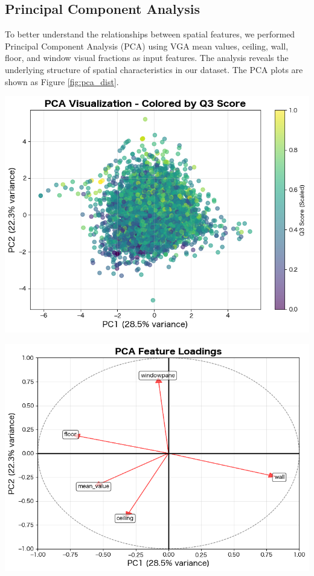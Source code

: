 \documentclass[11pt,a4paper]{article}
\begin{document}
\begin{multicols}{2}
\subsection{Principal Component Analysis}
To better understand the relationships between spatial features, we performed Principal Component Analysis (PCA) 
using VGA mean values, ceiling, wall, floor, and window visual fractions as input features. The analysis reveals 
the underlying structure of spatial characteristics in our dataset. The PCA plots are shown as Figure \ref{fig:pca_dist}.
\begin{center}
    \begin{minipage}{0.45\columnwidth}
        \centering
        \includegraphics[width=\textwidth]{plots/PCA_01.png}
    \end{minipage}
    \hfill
    \begin{minipage}{0.45\columnwidth}
        \centering
        \includegraphics[width=\textwidth]{plots/PCA_02.png}
    \end{minipage}
    \label{fig:pca_dist}
\end{center}



\end{multicols}
\end{document}
